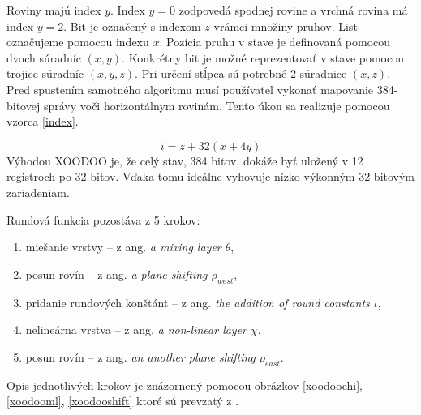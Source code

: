 Roviny majú index $y$. Index $y=0$ zodpovedá spodnej rovine a vrchná rovina má index $y=2$. Bit je označený s indexom $z$ vrámci množiny pruhov. List označujeme pomocou indexu $x$. Pozícia pruhu v stave je definovaná pomocou dvoch súradníc $(x,y)$. Konkrétny bit je možné reprezentovať v stave pomocou trojice súradníc $(x,y,z)$. Pri určení stĺpca sú potrebné 2 súradnice $(x,z)$. Pred spustením samotného algoritmu musí používateľ vykonať mapovanie 384-bitovej správy voči horizontálnym rovinám. Tento úkon sa realizuje pomocou vzorca \ref{index}.

\begin{equation}\label{index}
	i=z+32(x+4y)
\end{equation}
Výhodou XOODOO je, že celý stav, 384 bitov, dokáže byť uložený v 12 registroch po 32 bitov. Vďaka tomu ideálne vyhovuje nízko výkonným 32-bitovým zariadeniam.

Rundová funkcia pozostáva z 5 krokov:
\begin{enumerate}
	\item miešanie vrstvy -- z ang. \textit{a mixing layer $\theta$}, 
	\item posun rovín -- z ang. \textit{a plane shifting $\rho_{west}$}, 
	\item pridanie rundových konštánt -- z ang. \textit{the addition of round constants $\iota$},
	\item nelineárna vrstva -- z ang. \textit{a non-linear layer $\chi$},
	\item posun rovín -- z ang. \textit{an another plane shifting $\rho_{east}$}.
\end{enumerate}
Opis jednotlivých krokov je znázornený pomocou obrázkov \ref{xoodoochi}, \ref{xoodooml}, \ref{xoodooshift} ktoré sú prevzatý z \cite{xcb}.  

